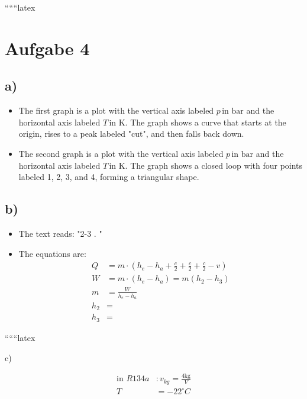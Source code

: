 
``````latex


\section*{Aufgabe 4}

\subsection*{a)}

\begin{itemize}
    \item The first graph is a plot with the vertical axis labeled \( p \, \text{in bar} \) and the horizontal axis labeled \( T \, \text{in K} \). The graph shows a curve that starts at the origin, rises to a peak labeled "cut", and then falls back down.
    \item The second graph is a plot with the vertical axis labeled \( p \, \text{in bar} \) and the horizontal axis labeled \( T \, \text{in K} \). The graph shows a closed loop with four points labeled 1, 2, 3, and 4, forming a triangular shape.
\end{itemize}

\subsection*{b)}

\begin{itemize}
    \item The text reads: "2-3 . "
    \item The equations are:
    \begin{align*}
        Q &= m \cdot (h_e - h_a + \frac{c}{2} + \frac{c}{2} + \frac{c}{2} - v) \\
        W &= m \cdot (h_e - h_a) = m (h_2 - h_3) \\
        m &= \frac{W}{h_e - h_a} \\
        h_2 &= \\
        h_3 &=
    \end{align*}
\end{itemize}

``````latex


c)

\begin{align*}
\text{in } R134a & : v_{kg} = \frac{4 \text{kg}}{V} \\
T & = -22^\circ C
\end{align*}

